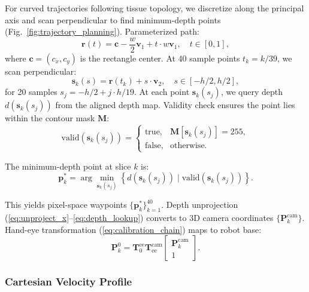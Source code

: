 \documentclass[journal]{IEEEtran}
\begin{document}
For curved trajectories following tissue topology, we discretize along the principal axis and scan perpendicular to find minimum-depth points (Fig.~\ref{fig:trajectory_planning}). Parameterized path:
\begin{equation}
\boldsymbol{r}(t) = \boldsymbol{c} - \frac{w}{2} \boldsymbol{v}_1 + t \cdot w \boldsymbol{v}_1, \quad t \in [0, 1],
\label{eq:axis_parameterization}
\end{equation}
where $\boldsymbol{c} = (c_x, c_y)$ is the rectangle center. At 40 sample points $t_k = k/39$, we scan perpendicular:
\begin{equation}
\boldsymbol{s}_k(s) = \boldsymbol{r}(t_k) + s \cdot \boldsymbol{v}_2, \quad s \in [-h/2, h/2],
\label{eq:perpendicular_scan}
\end{equation}
for 20 samples $s_j = -h/2 + j \cdot h/19$. At each point $\boldsymbol{s}_k(s_j)$, we query depth $d(\boldsymbol{s}_k(s_j))$ from the aligned depth map. Validity check ensures the point lies within the contour mask $\mathbf{M}$:
\begin{equation}
\text{valid}(\boldsymbol{s}_k(s_j)) = 
\begin{cases}
\text{true}, & \mathbf{M}[\boldsymbol{s}_k(s_j)] = 255, \\
\text{false}, & \text{otherwise}.
\end{cases}
\label{eq:mask_validity}
\end{equation}

The minimum-depth point at slice $k$ is:
\begin{equation}
\boldsymbol{p}_k^* = \arg\min_{\boldsymbol{s}_k(s_j)} \left\{ d(\boldsymbol{s}_k(s_j)) \mid \text{valid}(\boldsymbol{s}_k(s_j)) \right\}.
\label{eq:min_depth_point}
\end{equation}

This yields pixel-space waypoints $\{\boldsymbol{p}_k^*\}_{k=1}^{40}$. Depth unprojection (\ref{eq:unproject_x}--\ref{eq:depth_lookup}) converts to 3D camera coordinates $\{\boldsymbol{P}_k^{\text{cam}}\}$. Hand-eye transformation (\ref{eq:calibration_chain}) maps to robot base:
\begin{equation}
\boldsymbol{P}_k^{0} = \mathbf{T}_{0}^{\text{ee}} \mathbf{T}_{\text{ee}}^{\text{cam}} 
\begin{bmatrix} \boldsymbol{P}_k^{\text{cam}} \\ 1 \end{bmatrix}.
\label{eq:world_waypoint}
\end{equation}

\subsubsection{Cartesian Velocity Profile}
\end{document}
